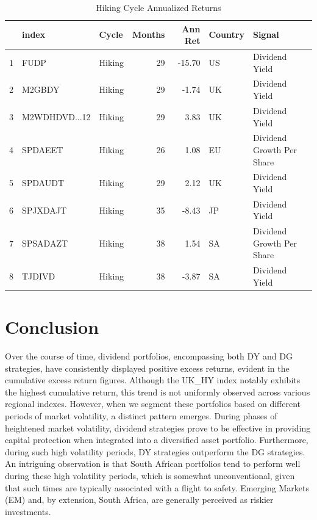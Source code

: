 \documentclass[11pt,preprint, authoryear]{elsarticle}
\numberwithin{equation}{section}
\numberwithin{figure}{section}
\numberwithin{table}{section}
\begin{document}
\begin{longtable}{rllrrll}
\caption{Hiking Cycle Annualized Returns  \label{tab1}} \\ 
  \hline
 & index & Cycle & Months & Ann Ret & Country & Signal \\ 
  \hline
1 & FUDP & Hiking &  29 & -15.70 & US & Dividend Yield \\ 
  2 & M2GBDY & Hiking &  29 & -1.74 & UK & Dividend Yield \\ 
  3 & M2WDHDVD...12 & Hiking &  29 & 3.83 & UK & Dividend Yield \\ 
  4 & SPDAEET & Hiking &  26 & 1.08 & EU & Dividend Growth Per Share \\ 
  5 & SPDAUDT & Hiking &  29 & 2.12 & UK & Dividend Yield \\ 
  6 & SPJXDAJT & Hiking &  35 & -8.43 & JP & Dividend Yield \\ 
  7 & SPSADAZT & Hiking &  38 & 1.54 & SA & Dividend Growth Per Share \\ 
  8 & TJDIVD & Hiking &  38 & -3.87 & SA & Dividend Yield \\ 
   \hline
\hline
\end{longtable}

\newpage

\hypertarget{conclusion}{%
\section*{Conclusion}\label{conclusion}}

Over the course of time, dividend portfolios, encompassing both DY and
DG strategies, have consistently displayed positive excess returns,
evident in the cumulative excess return figures. Although the UK\_HY
index notably exhibits the highest cumulative return, this trend is not
uniformly observed across various regional indexes. However, when we
segment these portfolios based on different periods of market
volatility, a distinct pattern emerges. During phases of heightened
market volatility, dividend strategies prove to be effective in
providing capital protection when integrated into a diversified asset
portfolio. Furthermore, during such high volatility periods, DY
strategies outperform the DG strategies. An intriguing observation is
that South African portfolios tend to perform well during these high
volatility periods, which is somewhat unconventional, given that such
times are typically associated with a flight to safety. Emerging Markets
(EM) and, by extension, South Africa, are generally perceived as riskier
investments.
\end{document}
